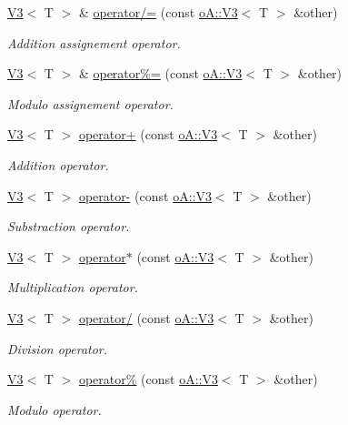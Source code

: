 \begin{DoxyCompactItemize}
\mbox{\hyperlink{structo_a_1_1_v3}{V3}}$<$ T $>$ \& \mbox{\hyperlink{structo_a_1_1_v3_a6bd81647929ff9d4ba4aa992074317e2}{operator/=}} (const \mbox{\hyperlink{structo_a_1_1_v3}{o\+A\+::\+V3}}$<$ T $>$ \&other)
\begin{DoxyCompactList}\small\item\em Addition assignement operator. \end{DoxyCompactList}\item 
\mbox{\hyperlink{structo_a_1_1_v3}{V3}}$<$ T $>$ \& \mbox{\hyperlink{structo_a_1_1_v3_ad311ac93d7c947c590a45320fbee26ac}{operator\%=}} (const \mbox{\hyperlink{structo_a_1_1_v3}{o\+A\+::\+V3}}$<$ T $>$ \&other)
\begin{DoxyCompactList}\small\item\em Modulo assignement operator. \end{DoxyCompactList}\item 
\mbox{\hyperlink{structo_a_1_1_v3}{V3}}$<$ T $>$ \mbox{\hyperlink{structo_a_1_1_v3_a2cf028f3352c9165b24f26e5c2bb173d}{operator+}} (const \mbox{\hyperlink{structo_a_1_1_v3}{o\+A\+::\+V3}}$<$ T $>$ \&other)
\begin{DoxyCompactList}\small\item\em Addition operator. \end{DoxyCompactList}\item 
\mbox{\hyperlink{structo_a_1_1_v3}{V3}}$<$ T $>$ \mbox{\hyperlink{structo_a_1_1_v3_a3e6d329582bd5e0b4ca407576b5135e4}{operator-\/}} (const \mbox{\hyperlink{structo_a_1_1_v3}{o\+A\+::\+V3}}$<$ T $>$ \&other)
\begin{DoxyCompactList}\small\item\em Substraction operator. \end{DoxyCompactList}\item 
\mbox{\hyperlink{structo_a_1_1_v3}{V3}}$<$ T $>$ \mbox{\hyperlink{structo_a_1_1_v3_a6171d787358a1cffd89786d4f13578bb}{operator$\ast$}} (const \mbox{\hyperlink{structo_a_1_1_v3}{o\+A\+::\+V3}}$<$ T $>$ \&other)
\begin{DoxyCompactList}\small\item\em Multiplication operator. \end{DoxyCompactList}\item 
\mbox{\hyperlink{structo_a_1_1_v3}{V3}}$<$ T $>$ \mbox{\hyperlink{structo_a_1_1_v3_a46bcba5d859f26e3ecffd4ceb7ca275f}{operator/}} (const \mbox{\hyperlink{structo_a_1_1_v3}{o\+A\+::\+V3}}$<$ T $>$ \&other)
\begin{DoxyCompactList}\small\item\em Division operator. \end{DoxyCompactList}\item 
\mbox{\hyperlink{structo_a_1_1_v3}{V3}}$<$ T $>$ \mbox{\hyperlink{structo_a_1_1_v3_a22fc8caa2afd56b20cc0239583695014}{operator\%}} (const \mbox{\hyperlink{structo_a_1_1_v3}{o\+A\+::\+V3}}$<$ T $>$ \&other)
\begin{DoxyCompactList}\small\item\em Modulo operator. \end{DoxyCompactList}\end{DoxyCompactItemize}
